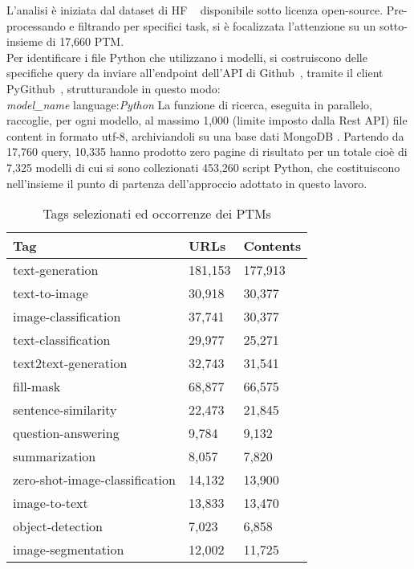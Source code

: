 \documentclass{article}
\begin{document}
L'analisi è iniziata dal dataset di HF ~\cite{ait_hfcommunity_2023} disponibile sotto licenza open-source. Pre-processando e filtrando per specifici task, si è focalizzata l'attenzione su un sotto-insieme di 17,660 PTM.\\
Per identificare i file Python che utilizzano i modelli, si costruiscono delle specifiche query da inviare all'endpoint dell'API di Github~\cite{github_rest}, tramite il client PyGithub~\cite{pygithub}, strutturandole in questo modo:\\
\emph{model\_name} language:\emph{Python}
La funzione di ricerca, eseguita in parallelo, raccoglie, per ogni modello, al massimo 1,000 (limite imposto dalla Rest API) file content in formato utf-8, archiviandoli su una base dati MongoDB \cite{pymongo}. 
Partendo da 17,760 query, 10,335 hanno prodotto zero pagine di risultato per un totale cioè di 7,325 modelli di cui si sono collezionati 453,260 script Python, che costituiscono nell'insieme il punto di partenza dell'approccio adottato in questo lavoro.
\begin{table}[htbp]
\small
    \centering    
    \caption{Tags selezionati ed occorrenze dei PTMs}
    \label{tab:tags2}
    \begin{tabular}{|l|l|l|}
    \hline
            Tag & URLs & Contents \\ \hline
            text-generation & 181,153 & 177,913\\ 
            text-to-image & 30,918 & 30,377\\ 
            image-classification & 37,741 & 30,377\\ 
            text-classification & 29,977 & 25,271\\ 
            text2text-generation & 32,743 & 31,541\\ 
            fill-mask & 68,877 & 66,575\\ 
            sentence-similarity & 22,473 & 21,845\\ 
            question-answering & 9,784 & 9,132\\ 
            summarization & 8,057 & 7,820\\ 
            zero-shot-image-classification & 14,132 & 13,900\\ 
            image-to-text & 13,833 & 13,470\\ 
            object-detection & 7,023 & 6,858\\ 
            image-segmentation & 12,002 & 11,725\\ \hline
    \end{tabular}
\end{table}
\end{document}
